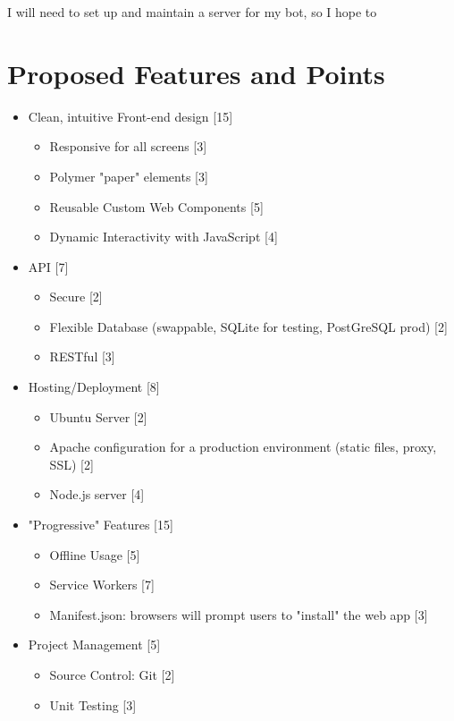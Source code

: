 \documentclass[11pt]{article}
\begin{document}
        I will need to set up and maintain a server for my bot, so I hope to

    \section{Proposed Features and Points}

        \begin{itemize}

            \item Clean, intuitive Front-end design [15]
                \begin{itemize}
                    \item Responsive for all screens [3]
                    \item Polymer "paper" elements [3]
                    \item Reusable Custom Web Components [5]
                    \item Dynamic Interactivity with JavaScript [4]
                \end{itemize}

            \item API [7]
                \begin{itemize}
                    \item Secure [2]
                    \item Flexible Database (swappable, SQLite for testing, PostGreSQL prod) [2]
                    \item RESTful [3]
                \end{itemize}

            \item Hosting/Deployment [8]
                \begin{itemize}
                    \item Ubuntu Server [2]
                    \item Apache configuration for a production environment (static files, proxy, SSL) [2]
                    \item Node.js server [4]
                \end{itemize}

            \item "Progressive" Features [15]
                \begin{itemize}
                    \item Offline Usage [5]
                    \item Service Workers [7]
                    \item Manifest.json: browsers will prompt users to "install" the web app [3]
                \end{itemize}

            \item Project Management [5]
                \begin{itemize}
                    \item Source Control: Git [2]
                    \item Unit Testing [3]
                \end{itemize}

        \end{itemize}
\end{document}
